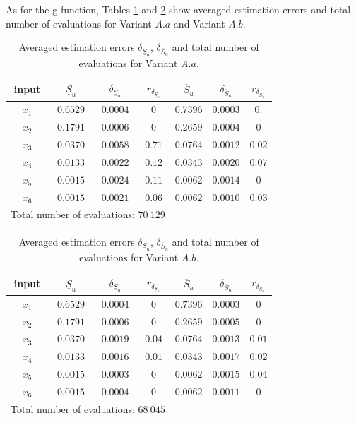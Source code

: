 As for the g-function, Tables \ref{res.bratley.Aa} and \ref{res.bratley.Ab} show averaged estimation errors and total number of evaluations for Variant $A.a$ and Variant $A.b$.
\begin{table}[!ht]
\caption{Averaged estimation errors $\delta_{\underline{S}_u}$, $\delta_{\overline{S}_u}$ and total number of evaluations for Variant $A.a$.}
\centering
\begin{tabular}{ccccccc}
\hline
 input & $\underline{S}_u$ & $\delta_{\underline{S}_u}$ & $r_{\delta_{\underline{S}_u}}$ & $\overline{S}_u$ & $\delta_{\overline{S}_u}$ &$r_{\delta_{\overline{S}_u}}$ \\ \hline
 $x_1$ & $0.6529$ &  $0.0004$ & $0$ & $0.7396$ & $0.0003$ & $0.$ \\ \hline
 $x_2$ & $0.1791$ &  $0.0006$ & $0$ & $0.2659$ & $0.0004$ & $0$ \\ \hline
 $x_3$ & $0.0370$ &  $0.0058$ & $0.71$ & $0.0764$ & $0.0012$ & $0.02$ \\ \hline
 $x_4$ & $0.0133$ &  $0.0022$ & $0.12$ & $0.0343$ & $0.0020$ & $0.07$ \\ \hline
 $x_5$ & $0.0015$ &  $0.0024$ & $0.11$ & $0.0062$ & $0.0014$ & $0$ \\ \hline
 $x_6$ & $0.0015$ & $0.0021$ & $0.06$  & $0.0062$ & $0.0010$ & $0.03$ \\ \hline \hline
\multicolumn{4}{l}{Total number of evaluations: $70 \ 129$} & & &\\ \hline 
\end{tabular}
\label{res.bratley.Aa}
\end{table}
\begin{table}[!ht]
\caption{Averaged estimation errors $\delta_{\underline{S}_u}$, $\delta_{\overline{S}_u}$ and total number of evaluations for Variant $A.b$.}
\centering
\begin{tabular}{ccccccc}
\hline
 input & $\underline{S}_u$ & $\delta_{\underline{S}_u}$ & $r_{\delta_{\underline{S}_u}}$ & $\overline{S}_u$ & $\delta_{\overline{S}_u}$ & $r_{\delta_{\overline{S}_u}}$ \\ \hline
 $x_1$ & $0.6529$ &  $0.0004$ & $0$ & $0.7396$ & $0.0003$ & $0$ \\ \hline
 $x_2$ & $0.1791$ &  $0.0006$ & $0$ & $0.2659$ & $0.0005$ & $0$ \\ \hline
 $x_3$ & $0.0370$ &  $0.0019$ & $0.04$ & $0.0764$ & $0.0013$ & $0.01$ \\ \hline
 $x_4$ & $0.0133$ &  $0.0016$ & $0.01$ & $0.0343$ & $0.0017$ & $0.02$ \\ \hline
 $x_5$ & $0.0015$ &  $0.0003$ & $0$ & $0.0062$ & $0.0015$ & $0.04$ \\ \hline
 $x_6$ & $0.0015$ &  $0.0004$ & $0$  & $0.0062$ & $0.0011$ & $0$ \\ \hline \hline
\multicolumn{4}{l}{Total number of evaluations: $68 \ 045$} & & &\\ \hline 
\end{tabular}
\label{res.bratley.Ab}
\end{table}

